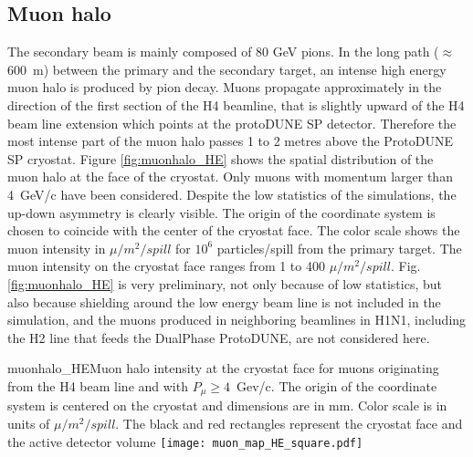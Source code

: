 \subsection{Muon halo}
The secondary beam is mainly composed of 80 GeV pions. In the long path ($\approx$ 600~m) between the primary and the secondary target,
 an intense high energy muon halo is produced by pion decay. Muons propagate approximately in the direction of the first section of the H4 beamline, 
 that is slightly upward of the H4 beam line extension which points at the protoDUNE SP detector.  
 Therefore the most intense part of the muon halo passes 1 to 2 metres above the ProtoDUNE SP cryostat. 
Figure \ref{fig:muonhalo_HE} shows the spatial distribution of the muon halo at the face of the cryostat. Only muons with momentum larger than 4~GeV/c have been considered. Despite the low statistics of the simulations, the up-down asymmetry is clearly visible. The origin of the coordinate system is chosen to coincide with the center of the cryostat face. The color scale shows the muon intensity in $\mu /m^2/spill$ for $10^6$ particles/spill from the primary target. The muon intensity on the cryostat face ranges from 1 to 400  $\mu /m^2/spill$.
Fig. \ref{fig:muonhalo_HE}  is very preliminary, not only because of low statistics, but also because shielding around the low energy beam line is not included in the simulation, and the muons produced in neighboring beamlines in H1N1, including the H2 line that feeds the DualPhase ProtoDUNE, are not considered here. 
\begin{cdrfigure}{muonhalo_HE}{Muon halo intensity at the cryostat face for muons originating from the H4 beam line and with $P_\mu  \ge 4$~Gev/c. The origin of the coordinate system is centered on the cryostat and dimensions are in mm. Color scale is in units of $\mu /m^2/spill$. The black and red rectangles represent the cryostat face and the active detector volume}
\texttt{[image: muon\_map\_HE\_square.pdf]}
\end{cdrfigure}




